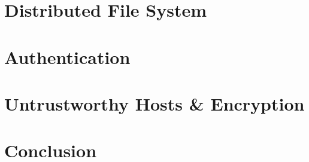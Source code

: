 \documentclass[a4paper,11pt, twocolumn]{report}
\begin{document}

\section{Distributed File System}

\section{Authentication}

\section{Untrustworthy Hosts \& Encryption}

\section{Conclusion}


\end{document}
